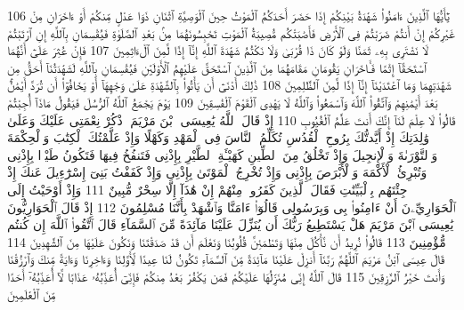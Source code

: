 {\tiny\colorbox{cl_aya}{106}} يَٰٓأَيُّهَا ٱلَّذِينَ ءَامَنُوا۟ شَهَٰدَةُ بَيْنِكُمْ إِذَا حَضَرَ أَحَدَكُمُ ٱلْمَوْتُ حِينَ ٱلْوَصِيَّةِ ٱثْنَانِ ذَوَا عَدْلٍ مِّنكُمْ أَوْ ءَاخَرَانِ مِنْ غَيْرِكُمْ إِنْ أَنتُمْ ضَرَبْتُمْ فِى ٱلْأَرْضِ فَأَصَٰبَتْكُم مُّصِيبَةُ ٱلْمَوْتِ تَحْبِسُونَهُمَا مِنۢ بَعْدِ ٱلصَّلَوٰةِ فَيُقْسِمَانِ بِٱللَّهِ إِنِ ٱرْتَبْتُمْ لَا نَشْتَرِى بِهِۦ ثَمَنًا وَلَوْ كَانَ ذَا قُرْبَىٰ وَلَا نَكْتُمُ شَهَٰدَةَ ٱللَّهِ إِنَّآ إِذًا لَّمِنَ ٱلْءَاثِمِينَ
{\tiny\colorbox{cl_aya}{107}} فَإِنْ عُثِرَ عَلَىٰٓ أَنَّهُمَا ٱسْتَحَقَّآ إِثْمًا فَـَٔاخَرَانِ يَقُومَانِ مَقَامَهُمَا مِنَ ٱلَّذِينَ ٱسْتَحَقَّ عَلَيْهِمُ ٱلْأَوْلَيَٰنِ فَيُقْسِمَانِ بِٱللَّهِ لَشَهَٰدَتُنَآ أَحَقُّ مِن شَهَٰدَتِهِمَا وَمَا ٱعْتَدَيْنَآ إِنَّآ إِذًا لَّمِنَ ٱلظَّٰلِمِينَ
{\tiny\colorbox{cl_aya}{108}} ذَٰلِكَ أَدْنَىٰٓ أَن يَأْتُوا۟ بِٱلشَّهَٰدَةِ عَلَىٰ وَجْهِهَآ أَوْ يَخَافُوٓا۟ أَن تُرَدَّ أَيْمَٰنٌۢ بَعْدَ أَيْمَٰنِهِمْ وَٱتَّقُوا۟ ٱللَّهَ وَٱسْمَعُوا۟ وَٱللَّهُ لَا يَهْدِى ٱلْقَوْمَ ٱلْفَٰسِقِينَ
{\tiny\colorbox{cl_aya}{109}} يَوْمَ يَجْمَعُ ٱللَّهُ ٱلرُّسُلَ فَيَقُولُ مَاذَآ أُجِبْتُمْ قَالُوا۟ لَا عِلْمَ لَنَآ إِنَّكَ أَنتَ عَلَّٰمُ ٱلْغُيُوبِ
{\tiny\colorbox{cl_aya}{110}} إِذْ قَالَ ٱللَّهُ يَٰعِيسَى ٱبْنَ مَرْيَمَ ٱذْكُرْ نِعْمَتِى عَلَيْكَ وَعَلَىٰ وَٰلِدَتِكَ إِذْ أَيَّدتُّكَ بِرُوحِ ٱلْقُدُسِ تُكَلِّمُ ٱلنَّاسَ فِى ٱلْمَهْدِ وَكَهْلًا وَإِذْ عَلَّمْتُكَ ٱلْكِتَٰبَ وَٱلْحِكْمَةَ وَٱلتَّوْرَىٰةَ وَٱلْإِنجِيلَ وَإِذْ تَخْلُقُ مِنَ ٱلطِّينِ كَهَيْـَٔةِ ٱلطَّيْرِ بِإِذْنِى فَتَنفُخُ فِيهَا فَتَكُونُ طَيْرًۢا بِإِذْنِى وَتُبْرِئُ ٱلْأَكْمَهَ وَٱلْأَبْرَصَ بِإِذْنِى وَإِذْ تُخْرِجُ ٱلْمَوْتَىٰ بِإِذْنِى وَإِذْ كَفَفْتُ بَنِىٓ إِسْرَٰٓءِيلَ عَنكَ إِذْ جِئْتَهُم بِٱلْبَيِّنَٰتِ فَقَالَ ٱلَّذِينَ كَفَرُوا۟ مِنْهُمْ إِنْ هَٰذَآ إِلَّا سِحْرٌ مُّبِينٌ
{\tiny\colorbox{cl_aya}{111}} وَإِذْ أَوْحَيْتُ إِلَى ٱلْحَوَارِيِّۦنَ أَنْ ءَامِنُوا۟ بِى وَبِرَسُولِى قَالُوٓا۟ ءَامَنَّا وَٱشْهَدْ بِأَنَّنَا مُسْلِمُونَ
{\tiny\colorbox{cl_aya}{112}} إِذْ قَالَ ٱلْحَوَارِيُّونَ يَٰعِيسَى ٱبْنَ مَرْيَمَ هَلْ يَسْتَطِيعُ رَبُّكَ أَن يُنَزِّلَ عَلَيْنَا مَآئِدَةً مِّنَ ٱلسَّمَآءِ قَالَ ٱتَّقُوا۟ ٱللَّهَ إِن كُنتُم مُّؤْمِنِينَ
{\tiny\colorbox{cl_aya}{113}} قَالُوا۟ نُرِيدُ أَن نَّأْكُلَ مِنْهَا وَتَطْمَئِنَّ قُلُوبُنَا وَنَعْلَمَ أَن قَدْ صَدَقْتَنَا وَنَكُونَ عَلَيْهَا مِنَ ٱلشَّٰهِدِينَ
{\tiny\colorbox{cl_aya}{114}} قَالَ عِيسَى ٱبْنُ مَرْيَمَ ٱللَّهُمَّ رَبَّنَآ أَنزِلْ عَلَيْنَا مَآئِدَةً مِّنَ ٱلسَّمَآءِ تَكُونُ لَنَا عِيدًا لِّأَوَّلِنَا وَءَاخِرِنَا وَءَايَةً مِّنكَ وَٱرْزُقْنَا وَأَنتَ خَيْرُ ٱلرَّٰزِقِينَ
{\tiny\colorbox{cl_aya}{115}} قَالَ ٱللَّهُ إِنِّى مُنَزِّلُهَا عَلَيْكُمْ فَمَن يَكْفُرْ بَعْدُ مِنكُمْ فَإِنِّىٓ أُعَذِّبُهُۥ عَذَابًا لَّآ أُعَذِّبُهُۥٓ أَحَدًا مِّنَ ٱلْعَٰلَمِينَ
